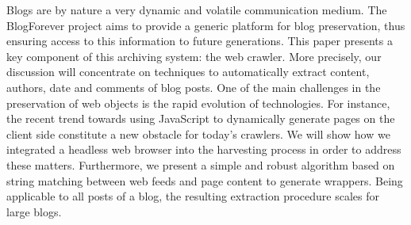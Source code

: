 Blogs are by nature a very dynamic and volatile communication medium. The
BlogForever project aims to provide a generic platform for blog preservation,
thus ensuring access to this information to future generations. This paper
presents a key component of this archiving system: the web crawler. More
precisely, our discussion will concentrate on techniques to automatically
extract content, authors, date and comments of blog posts. One of the main
challenges in the preservation of web objects is the rapid evolution of
technologies. For instance, the recent trend towards using JavaScript to
dynamically generate pages on the client side constitute a new obstacle for
today's crawlers. We will show how we integrated a headless web browser into the
harvesting process in order to address these matters. Furthermore, we present a
simple and robust algorithm based on string matching between web feeds and page
content to generate wrappers. Being applicable to all posts of a blog, the
resulting extraction procedure scales for large blogs.
